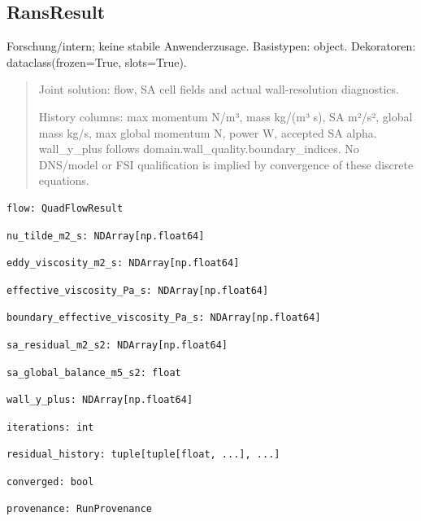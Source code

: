 \subsection{RansResult}
Forschung/intern; keine stabile Anwenderzusage.
Basistypen: object. Dekoratoren: dataclass(frozen=True, slots=True).
\begin{quote}
Joint solution: flow, SA cell fields and actual wall-resolution diagnostics.\par History columns: max momentum N/m³, mass kg/(m³ s), SA m²/s², global mass kg/s, max global momentum N, power W, accepted SA alpha. wall\_y\_plus follows domain.wall\_quality.boundary\_indices. No DNS/model or FSI qualification is implied by convergence of these discrete equations.
\end{quote}
\begin{lstlisting}
flow: QuadFlowResult
\end{lstlisting}
\begin{lstlisting}
nu_tilde_m2_s: NDArray[np.float64]
\end{lstlisting}
\begin{lstlisting}
eddy_viscosity_m2_s: NDArray[np.float64]
\end{lstlisting}
\begin{lstlisting}
effective_viscosity_Pa_s: NDArray[np.float64]
\end{lstlisting}
\begin{lstlisting}
boundary_effective_viscosity_Pa_s: NDArray[np.float64]
\end{lstlisting}
\begin{lstlisting}
sa_residual_m2_s2: NDArray[np.float64]
\end{lstlisting}
\begin{lstlisting}
sa_global_balance_m5_s2: float
\end{lstlisting}
\begin{lstlisting}
wall_y_plus: NDArray[np.float64]
\end{lstlisting}
\begin{lstlisting}
iterations: int
\end{lstlisting}
\begin{lstlisting}
residual_history: tuple[tuple[float, ...], ...]
\end{lstlisting}
\begin{lstlisting}
converged: bool
\end{lstlisting}
\begin{lstlisting}
provenance: RunProvenance
\end{lstlisting}
